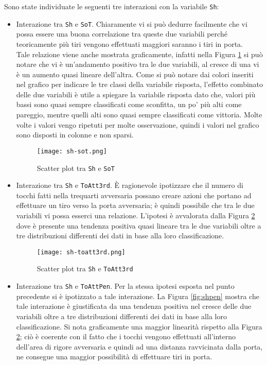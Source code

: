 Sono state individuate le seguenti tre interazioni con la variabile \texttt{Sh}:
\begin{itemize}
	\item Interazione tra \texttt{Sh} e \texttt{SoT}. Chiaramente vi si può dedurre facilmente che vi possa essere una buona correlazione tra queste due variabili perché teoricamente più tiri vengono effettuati maggiori saranno i tiri in porta. \\
	Tale relazione viene anche mostrata graficamente, infatti nella Figura \ref{fig:ShSoT} si può notare che vi è un'andamento positivo tra le due variabili, al cresce di una vi è un aumento quasi lineare dell'altra.
	Come si può notare dai colori inseriti nel grafico per indicare le tre classi della variabile risposta, l'effetto combinato delle due variabili è utile a spiegare la variabile risposta dato che, valori più bassi sono quasi sempre classificati come sconfitta, un po' più alti come pareggio, mentre quelli alti sono quasi sempre classificati come vittoria.
	Molte volte i valori vengo ripetuti per molte osservazione, quindi i valori nel grafico sono disposti in colonne e non sparsi.
	\begin{figure}[htbp]
		\begin{center}
			\texttt{[image: sh-sot.png]}
			\caption{Scatter plot tra \texttt{Sh} e \texttt{SoT}} \label{fig:ShSoT}
		\end{center}
	\end{figure} 
	\item Interazione tra \texttt{Sh} e \texttt{ToAtt3rd}. È ragionevole ipotizzare che il numero di tocchi fatti nella trequarti avversaria possano creare azioni che portano ad effettuare un tiro verso la porta avversaria; è quindi possibile che tra le due variabili vi possa esserci una relazione. L'ipotesi è avvalorata dalla Figura \ref{fig:shtreq} dove è presente una tendenza positiva quasi lineare tra le due variabili oltre a tre distribuzioni differenti dei dati in base alla loro classificazione.
	\begin{figure}[htbp]
		\begin{center}
			\texttt{[image: sh-toatt3rd.png]}
			\caption{Scatter plot tra \texttt{Sh} e \texttt{ToAtt3rd}} \label{fig:shtreq}
		\end{center}
	\end{figure}
	\item Interazione tra \texttt{Sh} e \texttt{ToAttPen}. Per la stessa ipotesi esposta nel punto precedente si è ipotizzato a tale interazione. La Figura \ref{fig:shpen} mostra che tale interazione è giustificata da una tendenza positiva nel cresce delle due variabili oltre a tre distribuzioni differenti dei dati in base alla loro classificazione. Si nota graficamente una maggior linearità rispetto alla Figura \ref{fig:shtreq}; ciò è coerente con il fatto che i tocchi vengono effettuati all'interno dell'area di rigore avversaria e quindi ad una distanza ravvicinata dalla porta, ne consegue una maggior possibilità di effettuare tiri in porta.

\end{itemize}
